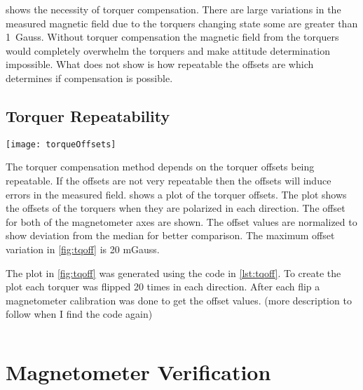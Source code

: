  shows the necessity of torquer compensation. There are large variations in the measured magnetic field due to the torquers changing state some are greater than 1~Gauss. Without torquer compensation the magnetic field from the torquers would completely overwhelm the torquers and make attitude determination impossible. What  does not show is how repeatable the offsets are which determines if compensation is possible.


\subsection{Torquer Repeatability}

\begin{sidewaysfigure}
    \centering
    \texttt{[image: torqueOffsets]}
    \caption{Box Plot from torquer offset test}
    \label{fig:tqoff}
\end{sidewaysfigure}

The torquer compensation method depends on the torquer offsets being repeatable. If the offsets are not very repeatable then the offsets will induce errors in the measured field.  shows a plot of the torquer offsets. The plot shows the offsets of the torquers when they are polarized in each direction. The offset for both of the magnetometer axes are shown. The offset values are normalized to show deviation from the median for better comparison. The maximum offset variation in \cref{fig:tqoff} is 20 mGauss.



The plot in \cref{fig:tqoff} was generated using the code in \cref{lst:tqoff}. To create the plot each torquer was flipped 20 times in each direction. After each flip a magnetometer calibration was done to get the offset values. (more description to follow when I find the code again)

\begin{lstlisting}[style=code,caption={Code to measure torquer repeatibility for the Y+ axis},label={lst:tqoff},language=Matlab]
%TODO: find the code that I used to make the plot...
\end{lstlisting}


\section{Magnetometer Verification}


